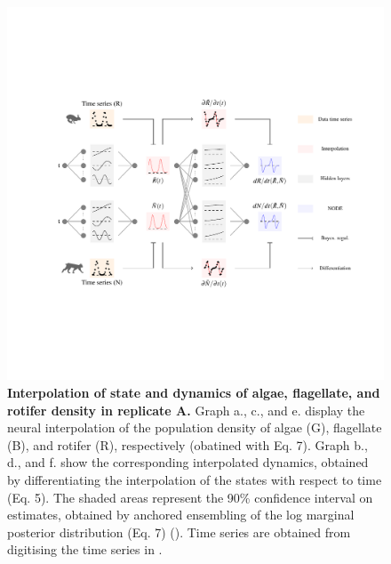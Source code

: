 \documentclass[11pt, oneside]{article}
\begin{document}
\begin{figure}[H]
\includegraphics[width=1\linewidth,page=7]{figures/main.pdf}
\caption{
    \textbf{Interpolation of state and dynamics of algae, flagellate, and rotifer density in replicate A.}
    Graph a., c., and e. display the neural interpolation of the population density of algae (G), flagellate (B), and rotifer (R), respectively (obatined with Eq. 7). 
    Graph b., d., and f. show the corresponding interpolated dynamics, obtained by differentiating the interpolation of the states with respect to time (Eq. 5).
    The shaded areas represent the 90\% confidence interval on estimates, obtained by anchored ensembling of the log marginal posterior distribution (Eq. 7) (\cite{Pearce2018}).
    Time series are obtained from digitising the time series in \cite{Hiltunen2013}.
}
\end{figure}
\newpage
\end{document}
